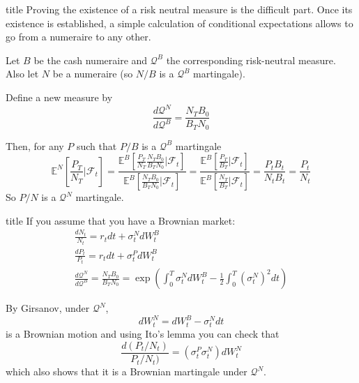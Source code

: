 \documentclass{beamer}
\begin{document}
\begin{frame}{title}
Proving the existence of a risk neutral measure is the difficult part. Once its existence is established, a simple calculation of conditional expectations allows to go from a numeraire to any other.

Let $B$ be the cash numeraire and $\mathcal{Q}^B$ the corresponding risk-neutral measure. Also let $N$ be a numeraire (so $N/B$ is a $\mathcal{Q}^B$ martingale). 

Define a new measure by
\begin{equation*}
	\frac{d\mathcal{Q}^N}{d\mathcal{Q}^B} = \frac{N_TB_0}{B_TN_0}
\end{equation*}

Then, for any $P$ such that $P/B$ is a $\mathcal{Q}^B$ martingale
\begin{equation*}
\mathbb{E}^N\left[\frac{P_T}{N_T}\bigg|\mathcal{F}_t\right] = \frac{\mathbb{E}^B\left[\frac{P_T}{N_T}\frac{N_TB_0}{B_TN_0}\bigg|\mathcal{F}_t\right]}{\mathbb{E}^B\left[\frac{N_TB_0}{B_TN_0}\bigg|\mathcal{F}_t\right]}
=\frac{\mathbb{E}^B\left[\frac{P_T}{B_T}\bigg|\mathcal{F}_t\right]}
{\mathbb{E}^B\left[\frac{N_T}{B_T}\bigg|\mathcal{F}_t\right]}
=\frac{P_tB_t}{N_tB_t}=\frac{P_t}{N_t}
\end{equation*}
So $P/N$ is a $\mathcal{Q}^N$ martingale.
\end{frame}

\begin{frame}{title}
If you assume that you have a Brownian market:
\begin{equation*}
\begin{gathered}
\frac{dN_t}{N_t} = r_tdt + \sigma^N_t dW^B_t \\
\frac{dP_t}{P_t} = r_tdt + \sigma^P_t dW^B_t \\
\frac{d\mathcal{Q}^N}{d\mathcal{Q}^B} = \frac{N_TB_0}{B_TN_0} = 
\exp\left(\int_0^T\sigma_t^N dW^B_t - \frac{1}{2}\int_0^T(\sigma^N_t)^2 dt\right)
\end{gathered}
\end{equation*}

By Girsanov, under $\mathcal{Q}^N$,
\begin{equation*}
dW^N_t = dW_t^B - \sigma_t^N dt
\end{equation*}
is a Brownian motion and using Ito's lemma you can check that
\begin{equation}
\frac{d(P_t/N_t)}{P_t/N_t)} = (\sigma^P_t \sigma^N_t)dW^N_t
\end{equation}
which also shows that it is a Brownian martingale under $\mathcal{Q}^N$.
\end{frame}
\end{document}
